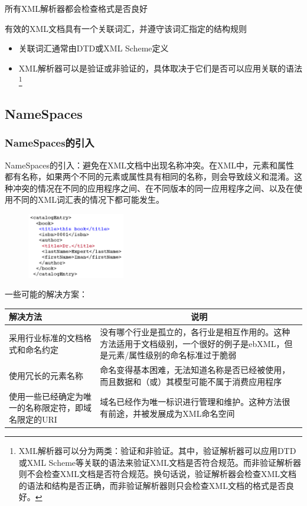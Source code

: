 所有XML解析器都会检查格式是否良好

有效的XML文档具有一个关联词汇，并遵守该词汇指定的结构规则
\begin{itemize}
    \item 关联词汇通常由DTD或XML Scheme定义
    \item XML解析器可以是验证或非验证的，具体取决于它们是否可以应用关联的语法
    \footnote{XML解析器可以分为两类：验证和非验证。其中，验证解析器可以应用DTD或XML Scheme等关联的语法来验证XML文档是否符合规范。而非验证解析器则不会检查XML文档是否符合规范。换句话说，验证解析器会检查XML文档的语法和结构是否正确，而非验证解析器则只会检查XML文档的格式是否良好。}
\end{itemize}

\subsection{NameSpaces}

\subsubsection{NameSpaces的引入}
NameSpaces的引入：避免在XML文档中出现名称冲突。在XML中，元素和属性都有名称，如果两个不同的元素或属性具有相同的名称，则会导致歧义和混淆。这种冲突的情况在不同的应用程序之间、在不同版本的同一应用程序之间、以及在使用不同的XML词汇表的情况下都可能发生。
\begin{figure}[H]
    \vspace{-0.5em}
	\centering
	\includegraphics[width=0.38\textwidth]{images/NameSpace的引入.png}
    \vspace{-1em}
\end{figure}

一些可能的解决方案：
\vspace{-0.5em}
\begin{spacing}{1.2}
    \centering
    \begin{longtable}{|m{6cm}<{\centering}|m{8cm}|}
		\hline
		解决方法 & \multicolumn{1}{c|}{说明}  \\ \hline
		采用行业标准的文档格式和命名约定 & 没有哪个行业是孤立的，各行业是相互作用的。这种方法适用于文档级别，一个很好的例子是ebXML，但是元素/属性级别的命名标准过于脆弱 \\ \hline
		使用冗长的元素名称 & 命名变得基本困难，无法知道名称是否已经被使用，而且数据和（或）其模型可能不属于消费应用程序 \\ \hline
		使用一些已经确定为唯一的名称限定符，即域名限定的URI & 域名已经作为唯一标识进行管理和维护。这种方法很有前途，并被发展成为XML命名空间 \\ \hline
    \end{longtable}
	\end{spacing}
\vspace{-1em}

